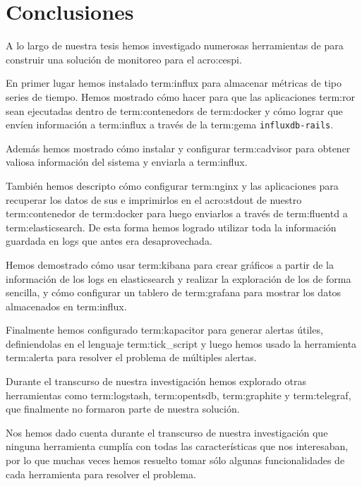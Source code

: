 \newpage
\section{Conclusiones}
\label{conclusiones}

A lo largo de nuestra tesis hemos investigado numerosas herramientas de
 para construir una solución de monitoreo para el
\gls{acro:cespi}.

En primer lugar hemos instalado \gls{term:influx} para almacenar métricas de
tipo series de tiempo. Hemos mostrado cómo hacer para que las aplicaciones
\gls{term:ror} sean ejecutadas dentro de \glspl{term:contenedor} de
\gls{term:docker} y cómo lograr que envíen información a \gls{term:influx} a
través de la \gls{term:gema} \texttt{influxdb-rails}.

Además hemos mostrado cómo instalar y configurar \gls{term:cadvisor} para
obtener valiosa información del sistema y enviarla a \gls{term:influx}.

También hemos descripto cómo configurar \gls{term:nginx} y las aplicaciones
para recuperar los datos de sus  e imprimirlos en el \gls{acro:stdout}
de nuestro \gls{term:contenedor} de \gls{term:docker} para luego enviarlos a
través de \gls{term:fluentd} a \gls{term:elasticsearch}. De esta forma hemos
logrado utilizar toda la información guardada en logs que antes era
desaprovechada.

Hemos demostrado cómo usar \gls{term:kibana} para crear gráficos a partir de la
información de los logs en elasticsearch y realizar la exploración de los
 de forma sencilla, y cómo configurar un tablero de \gls{term:grafana}
para mostrar los datos almacenados en \gls{term:influx}.


Finalmente hemos configurado \gls{term:kapacitor} para generar alertas útiles,
definiendolas en el lenguaje \gls{term:tick_script} y luego hemos usado la
herramienta \gls{term:alerta} para resolver el problema de múltiples alertas.

Durante el transcurso de nuestra investigación hemos explorado otras
herramientas como \gls{term:logstash}, \gls{term:opentsdb}, \gls{term:graphite}
y \gls{term:telegraf}, que finalmente no formaron parte de nuestra solución.

Nos hemos dado cuenta durante el transcurso de nuestra investigación que
ninguna herramienta cumplía con todas las características que nos interesaban,
por lo que muchas veces hemos resuelto tomar sólo algunas funcionalidades de
cada herramienta para resolver el problema.

